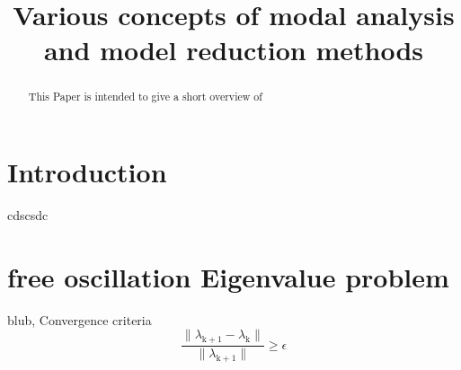 \documentclass[conference]{IEEEtran}
\begin{document}
\title{Various concepts of modal analysis and model reduction methods}

\author{
}

\maketitle

\begin{abstract}
This Paper is intended to give a short overview of 
\end{abstract}





%
\IEEEpeerreviewmaketitle

\section{Introduction}
cdscsdc
\section{free oscillation Eigenvalue problem}
blub, Convergence criteria
\begin{equation}
\frac{\lVert \lambda_{\mathrm{k+1}}-\lambda_{\mathrm{k}} \rVert}{\lVert \lambda_{\mathrm{k+1}}\rVert}\geq \epsilon
\end{equation}
\end{document}
